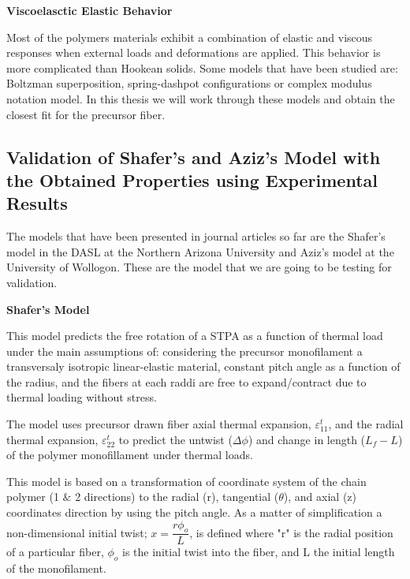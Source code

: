 \documentclass[12pt,oneside]{article}
\begin{document}
\vspace{0.5cm}
\textbf{Viscoelasctic Elastic Behavior} \par 
\vspace{0.5cm}
 Most of the polymers materials exhibit a combination of elastic and viscous responses when external loads and deformations are applied. This behavior is more complicated than Hookean solids. Some models that have been studied are: Boltzman superposition, spring-dashpot configurations or complex modulus notation model. In this thesis we will work through these models and obtain the closest fit for the precursor fiber. 




\subsection*{Validation of Shafer's and Aziz's Model with the Obtained Properties using Experimental Results}

\hspace{0.5cm}The models that have been presented in journal articles so far are the Shafer's model in the DASL at the Northern Arizona University and Aziz's model at the University of Wollogon. These are the model that we are going to be testing for validation. \\ \par

\hspace{0.5cm}\textbf{Shafer's Model}\\ \par

This model predicts the free rotation of a STPA as a function of thermal load under the main assumptions of: considering the precursor monofilament a transversaly isotropic linear-elastic material, constant pitch angle as a function of the radius, and the fibers at each raddi are free to expand/contract due to thermal loading without stress. \par
	The model uses precursor drawn fiber axial thermal expansion, $\varepsilon^{t}_{11}$, and the radial thermal expansion, $\varepsilon^{t}_{22}$ to predict the untwist ($\Delta \phi$) and change in length ($L_f - L$) of the polymer monofillament under thermal loads.\par 

	This model is based on a transformation of coordinate system of the chain polymer (1 $\&$ 2 directions) to the radial (r), tangential ($\theta$), and axial (z) coordinates direction by using the pitch angle. As a matter of simplification a non-dimensional initial twist; $x = \dfrac{r \phi_o}{L}$, is defined where "r" is the radial position of a particular fiber, $\phi_o$ is the initial twist into the fiber, and L the initial length of the monofilament. 
	
\end{document}
